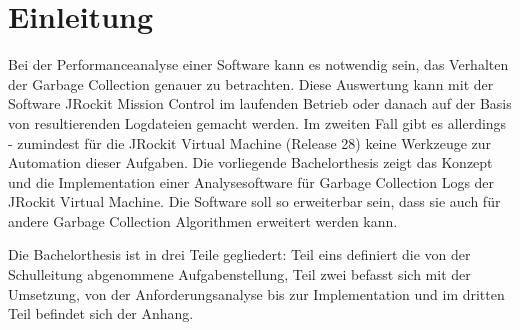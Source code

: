 \chapter*{Einleitung}
Bei der Performanceanalyse einer Software kann es notwendig sein, das  Verhalten der Garbage Collection genauer zu betrachten. Diese Auswertung kann mit der Software JRockit Mission Control im laufenden Betrieb oder danach auf der Basis von resultierenden Logdateien gemacht werden. Im zweiten Fall gibt es allerdings - zumindest für die JRockit Virtual Machine (Release 28) keine Werkzeuge zur Automation dieser Aufgaben. Die vorliegende Bachelorthesis zeigt das Konzept und die Implementation einer Analysesoftware für Garbage Collection Logs der JRockit Virtual Machine. Die Software soll so erweiterbar sein, dass sie auch für andere Garbage Collection Algorithmen erweitert werden kann.

Die Bachelorthesis ist in drei Teile gegliedert: Teil eins definiert die von der Schulleitung abgenommene Aufgabenstellung, Teil zwei befasst sich mit der Umsetzung, von der Anforderungsanalyse bis zur Implementation und im dritten Teil befindet sich der Anhang.